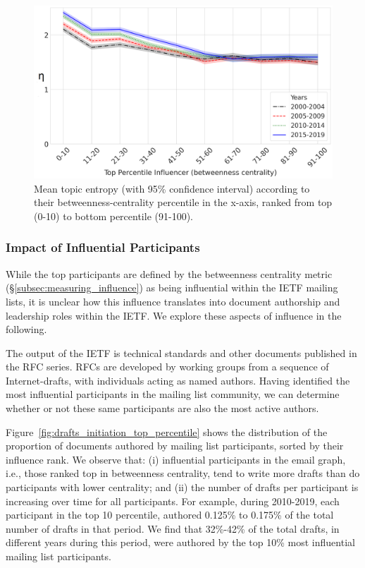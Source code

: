 \documentclass[twocolumn,10pt]{article}
\newlength{\figureWidthOneColumn}
\newcommand{\pb}[1]{\vspace{0.75ex}\noindent{\textbf{#1}}}
\begin{document}
\begin{figure}
  \centering
  \includegraphics[width=\figureWidthOneColumn]{figures-prev/icwsm-2022/topic-div.png}
  \caption{
    Mean topic entropy (with 95\% confidence interval) according to their
    betweenness-centrality percentile in the x-axis, ranked from top (0-10)
    to bottom percentile (91-100).
  }
  \label{fig:topic_diversity}
\end{figure}


\subsubsection{Impact of Influential Participants}
\label{subsec:impact_influence}


While the top participants are defined by the betweenness centrality metric
(\S\ref{subsec:measuring_influence}) as being influential within the IETF
mailing lists, it is unclear how this influence translates into document
authorship and leadership roles within the IETF.  We explore these aspects
of influence in the following.

\pb{Document authorship:}
The output of the IETF is technical standards and other documents published
in the RFC series. RFCs are developed by working groups from a sequence of
Internet-drafts, with individuals acting as named authors. Having identified
the most influential participants in the mailing list community, we can
determine whether or not these same participants are also the most active
authors.

Figure~\ref{fig:drafts_initiation_top_percentile} shows the distribution of
the proportion of documents authored by mailing list participants, sorted
by their influence rank. We observe that:
(i) influential participants in the email graph, i.e., those ranked top in
betweenness centrality, tend to write more drafts than do participants with
lower centrality; and
(ii) the number of drafts per participant is increasing over time for all
participants.
For example, during 2010-2019, each participant in the top 10 percentile,
authored 0.125\% to 0.175\% of the total number of drafts in that period.
We find that 32\%-42\% of the total drafts, in different years during this
period, were authored by the top 10\% most influential mailing list
participants.
\end{document}
